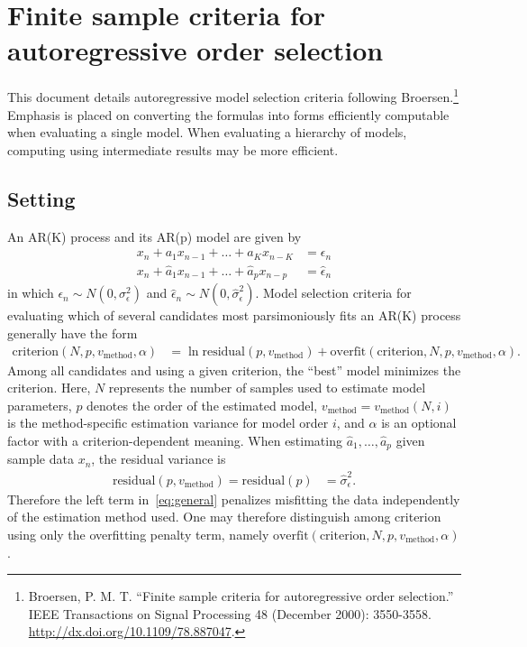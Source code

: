 \documentclass[12pt,letterpaper]{article}
\begin{document}
\section*{Finite sample criteria for autoregressive order selection}

This document details autoregressive model selection criteria following
Broersen.\footnote{Broersen, P. M. T. ``Finite sample criteria for
autoregressive order selection.'' IEEE Transactions on Signal Processing 48
(December 2000): 3550-3558.  \url{http://dx.doi.org/10.1109/78.887047}.}
Emphasis is placed on converting the formulas into forms efficiently computable
when evaluating a single model.  When evaluating a hierarchy of models,
computing using intermediate results may be more efficient.

\subsection*{Setting}

An AR(K) process and its AR(p) model are given by
\begin{subequations}
\begin{align}
    x_n+a_1x_{n-1}+\dots+a_Kx_{n-K}&=\epsilon_n
    \\
    {x}_n+\hat{a}_1x_{n-1}+\dots+\hat{a}_px_{n-p}&=\hat{\epsilon}_n
\end{align}
\end{subequations}
in which $\epsilon_n\sim N\left(0,\sigma_{\epsilon}^2\right)$ and
$\hat{\epsilon}_n\sim N\left(0,\hat{\sigma}_{\epsilon}^2\right)$.
Model selection criteria for evaluating which of several candidates most
parsimoniously fits an AR(K) process generally have the form
\begin{align}
    \label{eq:general}
    \text{criterion}\!\left(N,p,v_\text{method},\alpha\right)
    &=
    \ln \text{residual}\!\left(p,v_\text{method}\right)
    +
    \text{overfit}\!\left(\text{criterion},N,p,v_\text{method},\alpha\right)
    .
\end{align}
Among all candidates and using a given criterion, the ``best'' model minimizes
the criterion.  Here, $N$ represents the number of samples used to estimate
model parameters, $p$ denotes the order of the estimated model,
$v_\text{method}=v_\text{method}\!\left(N,i\right)$ is the method-specific
estimation variance for model order $i$, and $\alpha$ is an optional factor
with a criterion-dependent meaning.  When estimating
$\hat{a}_1,\dots,\hat{a}_p$ given sample data $x_n$, the residual variance is
\begin{align}
    \text{residual}\!\left(p,v_\text{method}\right)
    =
    \text{residual}\!\left(p\right)
    &=
    \hat{\sigma}_\epsilon^2
    .
\end{align}
Therefore the left term in~\eqref{eq:general} penalizes misfitting the data
independently of the estimation method used.  One may therefore distinguish
among criterion using only the overfitting penalty term, namely
$\text{overfit}\!\left(\text{criterion},N,p,v_\text{method},\alpha\right)$.
\end{document}
